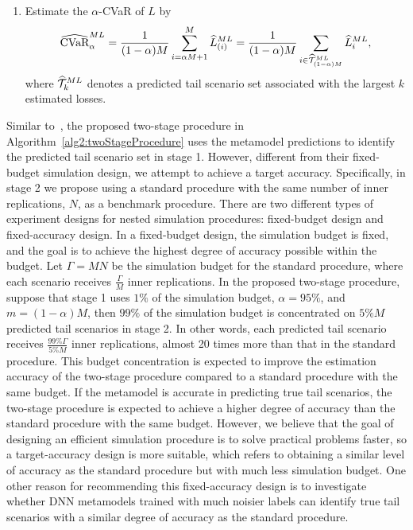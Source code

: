 \begin{algorithm}
\begin{algorithmic}[1]
\begin{enumerate} [label=\alph*., itemsep=0pt, parsep=0pt, topsep=0pt]
        \item Estimate the $\alpha$-CVaR of $L$ by 
        $$\widehat{\mbox{CVaR}}^{ML}_\alpha = \frac{1}{(1-\alpha)M} \sum_{i=\alpha M + 1}^{M}\widehat{L}_{(i)}^{ML} = \frac{1}{(1-\alpha)M} \sum_{i \in \widehat{\mathcal{T}}_{(1-\alpha)M}^{ML}}\widehat{L}_{i}^{ML},$$ 
        where $\widehat{\mathcal{T}}_{k}^{ML}$ denotes a predicted tail scenario set associated with the largest $k$ estimated losses.
    \end{enumerate}
\end{algorithmic}
\end{algorithm}

Similar to~\cite{dang2020efficient}, the proposed two-stage procedure in Algorithm~\ref{alg2:twoStageProcedure} uses the metamodel predictions to identify the predicted tail scenario set in stage 1.
However, different from their fixed-budget simulation design, we attempt to achieve a target accuracy.
Specifically, in stage 2 we propose using a standard procedure with the same number of inner replications, $N$, as a benchmark procedure.
There are two different types of experiment designs for nested simulation procedures: fixed-budget design and fixed-accuracy design.
In a fixed-budget design, the simulation budget is fixed, and the goal is to achieve the highest degree of accuracy possible within the budget.
Let $\Gamma = MN$ be the simulation budget for the standard procedure, where each scenario receives $\frac{\Gamma}{M}$ inner replications.
In the proposed two-stage procedure, suppose that stage 1 uses $1\%$ of the simulation budget, $\alpha = 95\%$, and $m=(1-\alpha)M$, then $99\%$ of the simulation budget is concentrated on $5\% M$ predicted tail scenarios in stage 2.
In other words, each predicted tail scenario receives $\frac{99\% \Gamma}{5\% M}$ inner replications, almost 20 times more than that in the standard procedure.
This budget concentration is expected to improve the estimation accuracy of the two-stage procedure compared to a standard procedure with the same budget. 
If the metamodel is accurate in predicting true tail scenarios, the two-stage procedure is expected to achieve a higher degree of accuracy than the standard procedure with the same budget.
However, we believe that the goal of designing an efficient simulation procedure is to solve practical problems faster, so a target-accuracy design is more suitable, which refers to obtaining a similar level of accuracy as the standard procedure but with much less simulation budget.
One other reason for recommending this fixed-accuracy design is to investigate whether DNN metamodels trained with much noisier labels can identify true tail scenarios with a similar degree of accuracy as the standard procedure.
